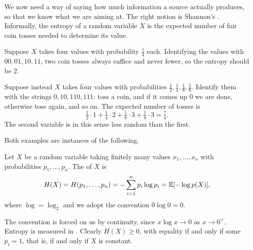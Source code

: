 \documentclass[a4paper]{scrartcl}
\begin{document}
We now need a way of saying how much information a source actually produces, so that we know what we are aiming at. The right notion is Shannon's . Informally, the entropy of a random variable $X$ is the expected number of fair coin tosses needed to determine its value.

\begin{example}
	Suppose $X$ takes four values with probability $\tfrac14$ each. Identifying the values with $00, 01, 10, 11$, two coin tosses always suffice and never fewer, so the entropy should be $2$.

	Suppose instead $X$ takes four values with probabilities $\tfrac12, \tfrac14, \tfrac18, \tfrac18$. Identify them with the strings $0, 10, 110, 111$: toss a coin, and if it comes up $0$ we are done, otherwise toss again, and so on. The expected number of tosses is
	$$\tfrac12 \cdot 1 + \tfrac14 \cdot 2 + \tfrac18 \cdot 3 + \tfrac18 \cdot 3 = \tfrac74.$$
	The second variable is in this sense less random than the first.
\end{example}

Both examples are instances of the following.

\begin{definition}[Entropy]
	Let $X$ be a random variable taking finitely many values $x_1, \dots, x_n$ with probabilities $p_1, \dots, p_n$. The  of $X$ is
	$$H(X) = H(p_1, \dots, p_n) = -\sum_{i=1}^n p_i \log p_i = \mathbb{E}[-\log p(X)],$$
	where $\log = \log_2$ and we adopt the convention $0\log 0 = 0$.
\end{definition}

The convention is forced on us by continuity, since $x \log x \to 0$ as $x \to 0^+$. Entropy is measured in . Clearly $H(X) \ge 0$, with equality if and only if some $p_i = 1$, that is, if and only if $X$ is constant.
\end{document}
